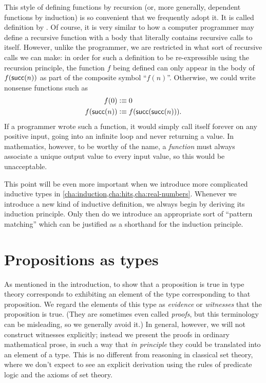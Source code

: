 This style of defining functions by recursion (or, more generally, dependent functions by induction) is so convenient that we frequently adopt it.
It is called definition by .
Of course, it is very similar to how a computer programmer may define a recursive function with a body that literally contains recursive calls to itself.
However, unlike the programmer, we are restricted in what sort of recursive calls we can make: in order for such a definition to be re-expressible using the recursion principle, the function $f$ being defined can only appear in the body of $f(\mathsf{succ}(n))$ as part of the composite symbol ``$f(n)$''.
Otherwise, we could write nonsense functions such as
\begin{align*}
  f(0)&\vcentcolon\equiv 0\\
  f(\mathsf{succ}(n)) &\vcentcolon\equiv f(\mathsf{succ}(\mathsf{succ}(n))).
\end{align*}
If a programmer wrote such a function, it would simply call itself forever on any positive input, going into an infinite loop and never returning a value.
In mathematics, however, to be worthy of the name, a \emph{function} must always associate a unique output value to every input value, so this would be unacceptable.

This point will be even more important when we introduce more complicated inductive types in \autoref{cha:induction,cha:hits,cha:real-numbers}.
Whenever we introduce a new kind of inductive definition, we always begin by deriving its induction principle.
Only then do we introduce an appropriate sort of ``pattern matching'' which can be justified as a shorthand for the induction principle.


\section{Propositions as types}
\label{sec:pat}

As mentioned in the introduction, to show that a proposition is true in type theory corresponds to exhibiting an element of the type corresponding to that proposition.
We regard the elements of this type as \emph{evidence} or \emph{witnesses} that the proposition is true. (They are sometimes even called \emph{proofs}, but this terminology can be misleading, so we generally avoid it.)
In general, however, we will not construct witnesses explicitly; instead we present the proofs in ordinary mathematical prose, in such a way that \emph{in principle} they could be translated into an element of a type.
This is no different from reasoning in classical set theory, where we don't expect to see an explicit derivation using the rules of predicate logic and the axioms of set theory.


